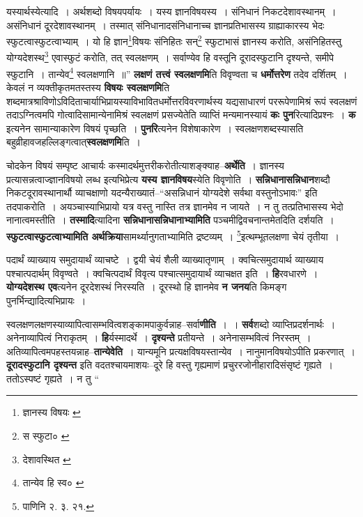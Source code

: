 \documentclass[article,12pt,a4paper]{memoir}
\begin{document}
	यस्यार्थस्येत्यादि । अर्थशब्दो विषयपर्यायः । यस्य ज्ञानविषयस्य । संनिधानं निकटदेशावस्थानम् । असंनिधानं दूरदेशावस्थानम् । तस्मात् संनिधानादसंनिधानाच्च ज्ञानप्रतिभासस्य ग्राह्याकारस्य भेदः स्फुटत्वास्फुटत्वाभ्याम् । यो हि ज्ञान\footnote{ज्ञानस्य विषयः \cite{dp-msA} \cite{dp-edP} \cite{dp-edH} \cite{dp-edE} \cite{dp-edN}}\-विषयः संनिहितः सन्\footnote{स स्फुटा० \cite{dp-msB} \cite{dp-msC} \cite{dp-msD}} स्फुटाभासं ज्ञानस्य करोति, असंनिहितस्तु योग्यदेशस्थ\footnote{देशावस्थित \cite{dp-msA} \cite{dp-msB} \cite{dp-msC} \cite{dp-edP} \cite{dp-edH} \cite{dp-edE} \cite{dp-edN}} एवास्फुटं करोति, तत् स्वलक्षणम् । सर्वाण्येव हि वस्तूनि दूरादस्फुटानि दृश्यन्ते, समीपे स्फुटानि । तान्येव\footnote{तान्येव हि स्व० \cite{dp-msC}} स्वलक्षणानि ॥” \textbf{लक्षणं तत्त्वं स्वलक्षणमि}ति विवृण्वता च \textbf{धर्मोत्तरेण} तदेव दर्शितम् । केवलं न व्यक्तीकृतमतस्तस्य \textbf{विषयः स्वलक्षणमि}ति शब्दमात्रश्राविणोऽविदिताचार्याभिप्रायस्याविभावितधर्मोत्तरविवरणार्थस्य यद्यसाधारणं पररूपेणामिश्रं रूपं स्वलक्षणं तदाऽग्नित्वमपि गोत्वादिसामान्येनामिश्रं स्वलक्षणं प्रसज्येतेति व्याप्तिं मन्यमानस्यायं \textbf{कः पुन}रित्यादिप्रश्नः । \textbf{क} इत्यनेन सामान्याकारेण विषयं पृच्छति । \textbf{पुनरि}त्यनेन विशेषाकारेण । स्वलक्षणशब्दस्यासति बहुव्रीहावजहल्लिङ्गत्वात्\textbf{स्वलक्षणमि}ति ।
	\pend
      

	  \pstart चोदकेन विषयं सम्पृष्ट आचार्यः कस्मादर्थमुत्तरीकरोतीत्याशङ्क्याह--\textbf{अर्थेति} । ज्ञानस्य प्रत्यासन्नत्वाज्ज्ञानविषयो लब्ध इत्यभिप्रेत्य \textbf{यस्य ज्ञानविषय}स्येति विवृणोति । \textbf{सन्निधानासन्निधान}शब्दौ निकटदूरावस्थानार्थौ व्याचक्षाणो यदन्यैराख्यातं--“असन्निधानं योग्यदेशे सर्वथा वस्तुनोऽभावः” इति तदपाकरोति । अयञ्चास्याभिप्रायो यत्र वस्तु नास्ति तत्र ज्ञानमेव न जायते । न तु तत्प्रतिभासस्य भेदो नानात्वमस्तीति । \textbf{तस्मादि}त्यादिना \textbf{स}\leavevmode{}\textbf{न्निधानासन्निधानाभ्यामिति} पञ्चमीद्विवचनान्तमेतदिति दर्शयति । \textbf{स्फुटत्वास्फुटत्वाभ्यामिति अर्थक्रिया}सामर्थ्यानुगताभ्यामिति द्रष्टव्यम् । \footnote{पाणिनि २. ३. २१.}\-इत्थम्भूतलक्षणा चेयं तृतीया ।
	\pend
      

	  \pstart पदार्थं व्याख्याय समुदायार्थं व्याचष्टे । द्वयी चेयं शैली व्याख्यातृणाम् । क्वचित्समुदायार्थ व्याख्याय पश्चात्पदार्थम् विवृण्वते । क्वचित्पदार्थं विवृत्य पश्चात्समुदायार्थं व्याचक्षत इति । \textbf{हि}रवधारणे । \textbf{योग्यदेशस्थ एव}त्यनेन दूरदेशस्थं निरस्यति । दूरस्थो हि ज्ञानमेव \textbf{न जनय}ति किमङ्ग पुनर्भिन्द्यादित्यभिप्रायः ।
	\pend
      

	  \pstart स्वलक्षणलक्षणस्याव्यापित्वासम्भवित्वशङ्कामपाकुर्वन्नाह--सर्वा\textbf{णीति} । । \textbf{सर्व}शब्दो व्याप्तिप्रदर्शनार्थः । अनेनाव्यापित्वं निराकृतम् । \textbf{हि}र्यस्मादर्थे । \textbf{दृश्यन्ते} प्रतीयन्ते । अनेनासम्भवित्वं निरस्तम् । अतिव्यापित्वमपहस्तयन्नाह--\textbf{तान्येवेति} । यान्यमूनि प्रत्यक्षविषयस्तान्येव । नानुमानविषयोऽपीति प्रकरणात् । \textbf{दूरादस्फुटानि दृश्यन्त} इति वदतश्चायमाशयः--दूरे हि वस्तु गृह्यमाणं प्रचुररजोनीहारादिसंसृष्टं गृह्यते । ततोऽस्पष्टं गृह्यते । न तु  \leavevmode{} “
	  
\end{document}
